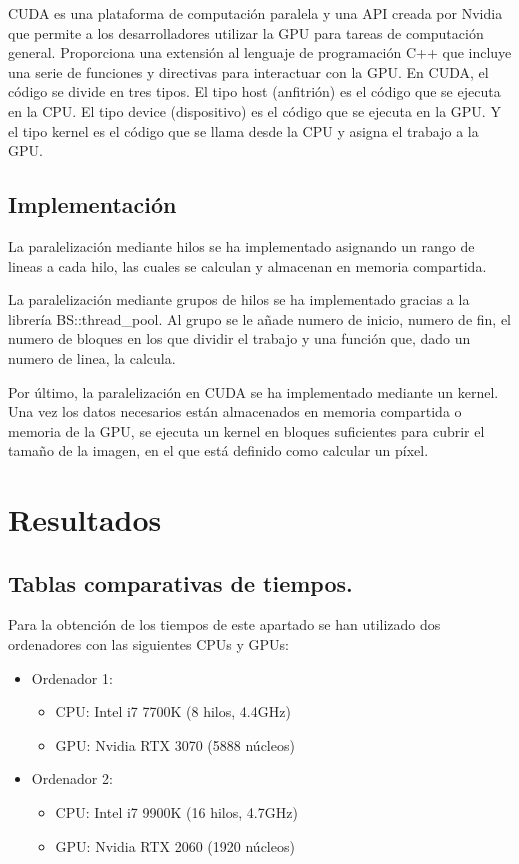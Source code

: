 \documentclass[10pt, a4paper]{article}
\begin{document}
CUDA es una plataforma de computación paralela y una API creada por Nvidia que permite a los desarrolladores utilizar la GPU para tareas de computación general. Proporciona una extensión al lenguaje de programación C++ que incluye una serie de funciones y directivas para interactuar con la GPU. En CUDA, el código se divide en tres tipos. El tipo host (anfitrión) es el código que se ejecuta en la CPU. El tipo device (dispositivo) es el código que se ejecuta en la GPU. Y el tipo kernel es el código que se llama desde la CPU y asigna el trabajo a la GPU.

\subsection{Implementación}

La paralelización mediante hilos se ha implementado asignando un rango de lineas a cada hilo, las cuales se calculan y almacenan en memoria compartida. 

La paralelización mediante grupos de hilos se ha implementado gracias a la librería BS::thread\_pool. Al grupo se le añade numero de inicio, numero de fin, el numero de bloques en los que dividir el trabajo y una función que, dado un numero de linea, la calcula.

Por último, la paralelización en CUDA se ha implementado mediante un kernel. Una vez los datos necesarios están almacenados en memoria compartida o memoria de la GPU, se ejecuta un kernel en bloques suficientes para cubrir el tamaño de la imagen, en el que está definido como calcular un píxel. 


\section{Resultados}

\subsection{Tablas comparativas de tiempos.}

Para la obtención de los tiempos de este apartado se han utilizado dos ordenadores con las siguientes CPUs y GPUs: 

\begin{itemize}
    \item Ordenador 1:
    \begin{itemize}
        \item CPU: Intel i7 7700K (8 hilos, 4.4GHz)
        \item GPU: Nvidia RTX 3070 (5888 núcleos)
    \end{itemize}
    \item Ordenador 2:
    \begin{itemize}
        \item CPU: Intel i7 9900K (16 hilos, 4.7GHz)
        \item GPU: Nvidia RTX 2060 (1920 núcleos)
    \end{itemize}
\end{itemize}
\end{document}
